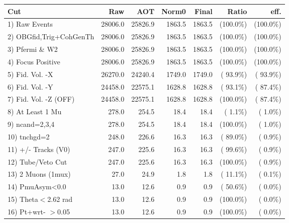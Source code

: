  \begin{table}[h!]\centering
 \begin{tabular}{||l||r|r|r|r|r|r||}
 \hline
 \hline
 Cut & Raw & AOT & Norm0 & Final & Ratio & eff.       \\
 \hline
  1) Raw Events           &      28006.0 &      25826.9 &       1863.5 &       1863.5 & (100.0\%) & (100.0\%) \\
  2) OBGfid,Trig+CohGenTh &      28006.0 &      25826.9 &       1863.5 &       1863.5 & (100.0\%) & (100.0\%) \\
  3) Pfermi \& W2         &      28006.0 &      25826.9 &       1863.5 &       1863.5 & (100.0\%) & (100.0\%) \\
  4) Focus Positive       &      28006.0 &      25826.9 &       1863.5 &       1863.5 & (100.0\%) & (100.0\%) \\
  5) Fid. Vol. -X         &      26270.0 &      24240.4 &       1749.0 &       1749.0 & ( 93.9\%) & ( 93.9\%) \\
  6) Fid. Vol. -Y         &      24458.0 &      22575.1 &       1628.8 &       1628.8 & ( 93.1\%) & ( 87.4\%) \\
  7) Fid. Vol. -Z (OFF)   &      24458.0 &      22575.1 &       1628.8 &       1628.8 & (100.0\%) & ( 87.4\%) \\
  8) At Least 1 Mu        &        278.0 &        254.5 &         18.4 &         18.4 & (  1.1\%) & (  1.0\%) \\
  9) ncand=2,3,4          &        278.0 &        254.5 &         18.4 &         18.4 & (100.0\%) & (  1.0\%) \\
 10) tnchgd=2             &        248.0 &        226.6 &         16.3 &         16.3 & ( 89.0\%) & (  0.9\%) \\
 11) +/- Tracks (V0)      &        247.0 &        225.6 &         16.3 &         16.3 & ( 99.6\%) & (  0.9\%) \\
 12) Tube/Veto Cut        &        247.0 &        225.6 &         16.3 &         16.3 & (100.0\%) & (  0.9\%) \\
 13) 2 Muons (1mux)       &         27.0 &         24.9 &          1.8 &          1.8 & ( 11.1\%) & (  0.1\%) \\
 14) PmuAsym<0.0          &         13.0 &         12.6 &          0.9 &          0.9 & ( 50.6\%) & (  0.0\%) \\
 15) Theta$<$2.62 rad     &         13.0 &         12.6 &          0.9 &          0.9 & (100.0\%) & (  0.0\%) \\
 16) Pt+wrt- $>$0.05      &         13.0 &         12.6 &          0.9 &          0.9 & (100.0\%) & (  0.0\%) \\

\end{tabular}
\end{table}

